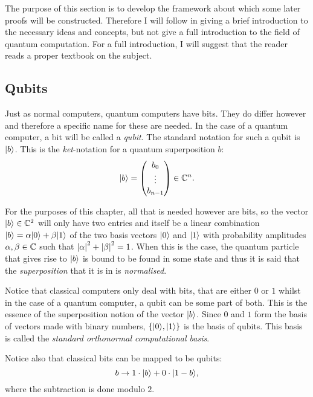 The purpose of this section is to develop the framework about which some later proofs will be constructed. Therefore I will follow \cite{HHK} in giving a brief introduction to the necessary ideas and concepts, but not give a full introduction to the field of quantum computation. For a full introduction, I will suggest that the reader reads a proper textbook on the subject.



\subsection{Qubits}
\label{subsec:qubits}

Just as normal computers, quantum computers have bits. They do differ however and therefore a specific name for these are needed. In the case of a quantum computer, a bit will be called a \emph{qubit}. The standard notation for such a qubit is \emph{$\lvert b\rangle$}. This is the \emph{ket}-notation for a quantum superposition $b$:
\[
	\lvert b\rangle = \begin{pmatrix}
		b_0\\
		\vdots\\
		b_{n-1}
	\end{pmatrix} \in \mathbb{C}^n.
\]
	
For the purposes of this chapter, all that is needed however are bits, so the vector $\lvert b\rangle \in \mathbb{C}^2$ will only have two entries and itself be a linear combination $\lvert b\rangle = \alpha \lvert0\rangle + \beta \lvert1\rangle$ of the two basis vectors $\lvert0\rangle$ and $\lvert1\rangle$ with probability amplitudes $\alpha, \beta \in \mathbb{C}$ such that $\left\vert \alpha \right\vert^2 + \left\vert \beta \right\vert^2 = 1$. When this is the case, the quantum particle that gives rise to $\lvert b\rangle$ is bound to be found in some state and thus it is said that the \emph{superposition} that it is in is \emph{normalised}.

Notice that classical computers only deal with bits, that are either $0$ or $1$ whilst in the case of a quantum computer, a qubit can be some part of both. This is the essence of the superposition notion of the vector $\lvert b\rangle$. Since $0$ and $1$ form the basis of vectors made with binary numbers, $\left\{ \lvert0\rangle, \lvert1\rangle \right\}$ is the basis of qubits. This basis is called the \emph{standard orthonormal computational basis}.

Notice also that classical bits can be mapped to be qubits:
\[
	b \rightarrow 1 \cdot \lvert b\rangle + 0 \cdot \lvert1 - b\rangle,
\]
where the subtraction is done modulo $2$.



